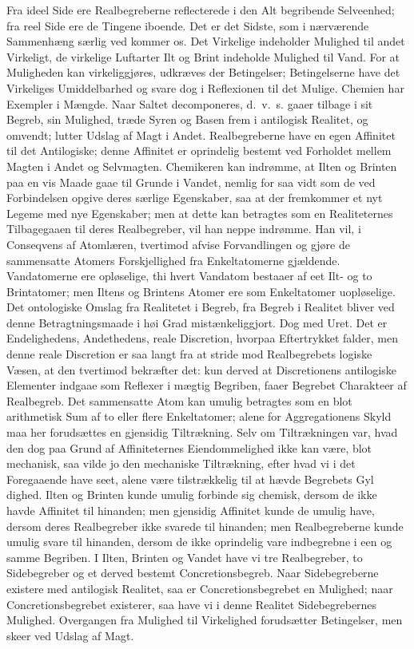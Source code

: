 \documentclass[12pt]{article}
\newcommand{\opage}[1]{\marginnote{\footnotesize\textit{[#1]}}}
\begin{document}
Fra ideel Side ere Realbegreberne reflecterede i den Alt begribende
Selveenhed; fra reel Side ere de Tingene iboende. Det er det Sidste,
som i nærværende Sammenhæng særlig ved%
\opage{42}kommer os. Det Virkelige indeholder Mulighed til andet Virkeligt,
de virkelige Luftarter Ilt og Brint indeholde Mulighed til Vand.
For at Muligheden kan virkeliggjøres, udkræves der Betingelser;
Betingelserne have det Virkeliges Umiddelbarhed og svare dog i
Reflexionen til det Mulige. Chemien har Exempler i Mængde. Naar
Saltet decomponeres, d.\ v.\ s. gaaer tilbage i sit Begreb, sin
Mulighed, træde Syren og Basen frem i antilogisk Realitet, og
omvendt; lutter Udslag af Magt i Andet. Realbegreberne have en egen
Affinitet til det Antilogiske; denne Affinitet er oprindelig bestemt
ved Forholdet mellem Magten i Andet og Selvmagten. Chemikeren kan
indrømme, at Ilten og Brinten paa en vis Maade gaae til Grunde i
Vandet, nemlig for saa vidt som de ved Forbindelsen opgive deres
særlige Egenskaber, saa at der fremkommer et nyt Legeme med nye
Egenskaber; men at dette kan betragtes som en Realiteternes
Tilbagegaaen til deres Realbegreber, vil han neppe indrømme. Han
vil, i Conseqvens af Atomlæren, tvertimod afvise Forvandlingen og
gjøre de sammensatte Atomers Forskjellighed fra Enkeltatomerne
gjældende. Vandatomerne ere opløselige, thi hvert Vandatom bestaaer
af eet Ilt- og to Brintatomer; men Iltens og Brintens Atomer ere
som Enkeltatomer uopløselige. Det ontologiske Omslag fra Realitetet
i Begreb, fra Begreb i Realitet bliver ved denne Betragtningsmaade i
høi Grad mistænkeliggjort. Dog med Uret. Det er Endelighedens,
Andethedens, reale Discretion, hvorpaa Eftertrykket falder, men
denne reale Discretion er saa langt fra at stride mod Realbegrebets
logiske Væsen, at den tvertimod bekræfter det: kun derved at
Discretionens antilogiske Elementer indgaae som Reflexer i mægtig
Begriben, faaer Begrebet Charakteer af Realbegreb. Det sammensatte
Atom kan umulig betragtes som en blot arithmetisk Sum af to eller
flere Enkeltatomer; alene for Aggregationens Skyld maa her
forudsættes en gjensidig Tiltrækning. Selv om Tiltrækningen var,
hvad den dog paa Grund af Affiniteternes Eiendommelighed ikke kan
være, blot mechanisk, saa vilde jo den mechaniske Tiltrækning,
efter hvad vi i det Foregaaende have seet, alene være tilstrækkelig
til at hævde Begrebets Gyl%
\opage{43}dighed. Ilten og Brinten kunde umulig forbinde sig chemisk, dersom
de ikke havde Affinitet til hinanden; men gjensidig Affinitet kunde
de umulig have, dersom deres Realbegreber ikke svarede til
hinanden; men Realbegreberne kunde umulig svare til hinanden,
dersom de ikke oprindelig vare indbegrebne i een og samme Begriben.
I Ilten, Brinten og Vandet have vi tre Realbegreber, to Sidebegreber
og et derved bestemt Concretionsbegreb. Naar Sidebegreberne
existere med antilogisk Realitet, saa er Concretionsbegrebet en
Mulighed; naar Concretionsbegrebet existerer, saa have vi i denne
Realitet Sidebegrebernes Mulighed. Overgangen fra Mulighed til
Virkelighed forudsætter Betingelser, men skeer ved Udslag af Magt.
\end{document}

